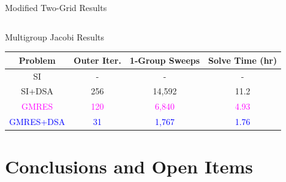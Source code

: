 \documentclass[compress,10pt]{beamer}
\newcommand{\tcb}[1]{\textcolor{blue}{#1}}
\newcommand{\tcm}[1]{\textcolor{magenta}{#1}}
\begin{document}
\begin{frame}[t]
{{\begin{block}{Modified Two-Grid Results}
\begin{table}
\begin{tabular}{|c|c|c|c|}
\end{tabular}
\end{table}
\end{block}
\vspace{-2mm}
\begin{block}{Multigroup Jacobi Results}
\begin{table}
\begin{tabular}{|c|c|c|c|}
\hline
Problem & Outer Iter. & 1-Group Sweeps & Solve Time (hr)  \\
\hline \hline
SI &  - & - & -  \\ \hline
SI+DSA & 256 &  14,592 & 11.2 \\ \hline
\tcm{GMRES} & \tcm{120} & \tcm{6,840} & \tcm{4.93} \\ \hline
\tcb{GMRES+DSA} & \tcb{31}& \tcb{1,767} & \tcb{1.76} \\ \hline
\end{tabular}
\end{table}
\end{block}
}
}
\end{frame}
\typeout{***********************************************************************************}
\section{Conclusions and Open Items}
\end{document}
